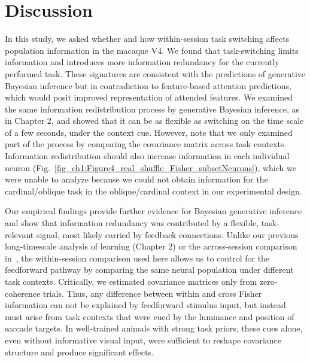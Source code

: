 \documentclass[lineno,pdflatex,sn-basic]{sn-jnl}%
\theoremstyle{thmstyleone}%
\theoremstyle{thmstyletwo}%
\theoremstyle{thmstylethree}%
\begin{document}
\section{Discussion}\label{discussion}

In this study, we asked whether and how within-session task switching affects population information in the macaque V4. We found that task-switching limits information and introduces more information redundancy for the currently performed task. These signatures are consistent with the predictions of generative Bayesian inference but in contradiction to feature-based attention predictions, which would posit improved representation of attended features. We examined the same information redistribution process by generative Bayesian inference, as in Chapter 2, and showed that it can be as flexible as switching on the time scale of a few seconds, under the context cue. However, note that we only examined part of the process by comparing the covariance matrix across task contexts. Information redistribution should also increase information in each individual neuron (Fig.~\ref{fig_ch1:Figure4_real_shuffle_Fisher_subsetNeurons}), which we were unable to analyze because we could not obtain information for the cardinal/oblique task in the oblique/cardinal context in our experimental design.

Our empirical findings provide further evidence for Bayesian generative inference and show that information redundancy was contributed by a flexible, task-relevant signal, most likely carried by feedback connections. Unlike our previous long-timescale analysis of learning (Chapter 2) or the across-session comparison in~\citet{bondy2018feedback}, the within-session comparison used here allows us to control for the feedforward pathway by comparing the same neural population under different task contexts. Critically, we estimated covariance matrices only from zero-coherence trials. Thus, any difference between within and cross Fisher information can not be explained by feedforward stimulus input, but instead must arise from task contexts that were cued by the luminance and position of saccade targets. In well-trained animals with strong task priors, these cues alone, even without informative visual input, were sufficient to reshape covariance structure and produce significant effects.
\end{document}
